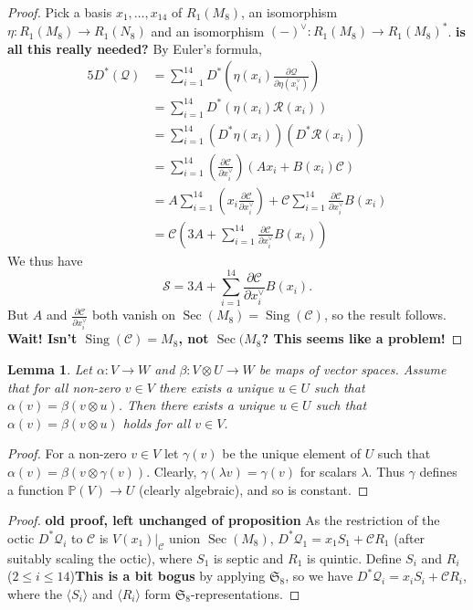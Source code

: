 \documentclass{amsart}
\newtheorem{lemma}[theorem]{Lemma}
\theoremstyle{definition}
\theoremstyle{remark}
\DeclareMathOperator{\Sing}{Sing}
\DeclareMathOperator{\Sec}{Sec}
\def\SS{\mathfrak{S}}
\def\P{\mathbb{P}}
\def\cubic{\mathcal{C}}
\def\quintic{\mathcal{Q}}
\def\septic{\mathcal{S}}
\let\mc\mathcal
\begin{document}
{\begin{proof}
Pick a basis $x_1, \ldots, x_{14}$ of $R_1(M_8)$, an isomorphism $\eta:R_1(M_8) \to R_1(N_8)$ and an isomorphism
$(-)^{\vee}:R_1(M_8) \to R_1(M_8)^*$.  {\bf is all this really needed?} By Euler's formula,
\begin{align*}
5 D^*(\quintic)
&= \sum_{i=1}^{14} D^* \left( \eta(x_i) \frac{\partial \quintic}{\partial \eta(x_i^{\vee})} \right) \\
&= \sum_{i=1}^{14} D^* \left( \eta(x_i) \mc{R}(x_i) \right) \\
&= \sum_{i=1}^{14} \left( D^* \eta(x_i) \right) \left( D^* \mc{R}(x_i) \right) \\
&= \sum_{i=1}^{14} \left( \frac{\partial \cubic}{\partial x_i^{\vee}} \right) \left( Ax_i + B(x_i)\cubic \right) \\
&= A \sum_{i=1}^{14} \left( x_i \frac{\partial \cubic}{\partial x_i^{\vee}} \right)
   + \cubic \sum_{i=1}^{14} \frac{\partial \cubic}{\partial x_i^{\vee}} B(x_i) \\
&= \cubic \left( 3A  + \sum_{i=1}^{14} \frac{\partial \cubic}{\partial x_i^{\vee}} B(x_i) \right)
\end{align*}
We thus have
\begin{displaymath}
\septic = 3A + \sum_{i=1}^{14} \frac{\partial \cubic}{\partial x_i^{\vee}} B(x_i).
\end{displaymath}
But $A$ and $\frac{\partial \cubic}{\partial x_i^{\vee}}$ both vanish on $\Sec(M_8)=\Sing(\cubic)$, so the result
follows.  {\bf Wait!  Isn't $\Sing(\cubic)=M_8$, not $\Sec(M_8$?  This seems like a problem!}
\end{proof}

\begin{lemma}
Let $\alpha:V \to W$ and $\beta:V \otimes U \to W$ be maps of vector spaces.  Assume that for all non-zero $v \in V$
there exists a unique $u \in U$ such that $\alpha(v)=\beta(v \otimes u)$.  Then there exists a unique $u \in U$ such
that $\alpha(v)=\beta(v \otimes u)$ holds for all $v \in V$.
\end{lemma}

\begin{proof}
For a non-zero $v \in V$ let $\gamma(v)$ be the unique element of $U$ such that $\alpha(v)=\beta(v \otimes \gamma(v))$.
Clearly, $\gamma(\lambda v)=\gamma(v)$ for scalars $\lambda$.  Thus $\gamma$ defines a function $\P(V) \to U$ (clearly
algebraic), and so is constant.
\end{proof}

\begin{proof}
{\bf old proof, left unchanged of proposition}
As the restriction of the octic $D^* \quintic_i$ to $\cubic$  is 
$V(x_1)|_{\cubic}$ union $\Sec (M_8)$,
$D^* \quintic_1  = x_1 S_1 + \cubic R_1$ (after suitably scaling the octic), where $S_1$ is septic and $R_1$ is
quintic.
Define $S_i$ and $R_i$  ($2 \leq i \leq 14$){\bf This is a bit bogus}
by applying $\SS_8$, so we have $D^* \quintic_i = x_i S_i + \cubic R_i$, where the
$\langle S_i \rangle$ and $\langle R_i \rangle$ form $\SS_8$-representations.    


\end{proof}}
\end{document}
